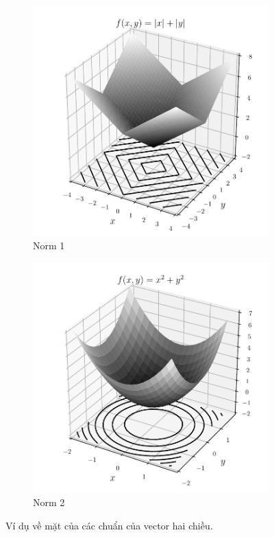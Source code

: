 \begin{figure}[t]
    \begin{subfigure}{0.48\textwidth}
    \includegraphics[width=0.999\linewidth]{ebookML_src/src/convexity/norm1_surf.pdf}
    \caption{Norm 1}
    \label{fig:subim1}
    \end{subfigure}
    \begin{subfigure}{0.48\textwidth}
    \includegraphics[width=0.999\linewidth]{ebookML_src/src/convexity/norm2_surf.pdf}
    \caption{Norm 2}
    \label{fig:subim2}
    \end{subfigure}
    \caption{Ví dụ về mặt của các chuẩn của vector hai chiều.}
    \label{fig:16_norm_surf}
\end{figure}
